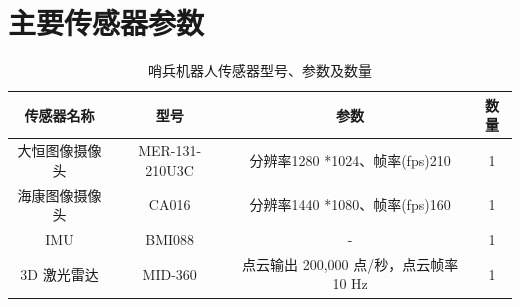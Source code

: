 \section{主要传感器参数}

\begin{table}[htbp]
    \centering
    \begin{tabular}{cccc}
        \toprule
        传感器名称& 型号 & 参数 & 数量 \\
        \midrule
         大恒图像摄像头 & MER-131-210U3C & 分辨率1280 *1024、帧率(fps)210   &1 \\   
         \midrule
         海康图像摄像头 & CA016 & 分辨率1440 *1080、帧率(fps)160   &1 \\ 
         \midrule
         IMU & BMI088 & - & 1 \\
         \midrule
         3D 激光雷达 & MID-360 & 点云输出 200,000 点/秒，点云帧率 10 Hz & 1\\
         \midrule
        
    \end{tabular}
    \caption{哨兵机器人传感器型号、参数及数量}
    \label{tab:哨兵机器人传感器型号、参数及数量}
\end{table}
